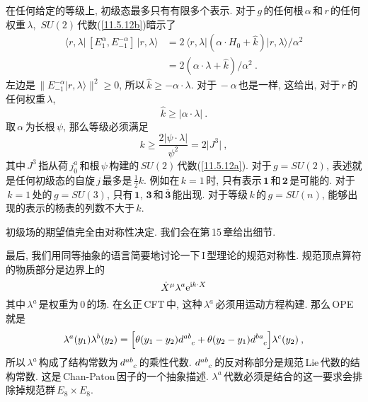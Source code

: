 在任何给定的等级上, 初级态最多只有有限多个表示. 对于$\,g\,$的任何根$\,\alpha\,$和$\,r\,$的任何权重$\,\lambda$, $\,SU(2)\,$代数(\ref{11.5.12b})暗示了
\begin{align}
    \langle r,\lambda \rvert\, [E_{1}^{\alpha},E_{-1}^{-\alpha}]\,\lvert r,\lambda\rangle 
    &= 2\,\langle r,\lambda \rvert (\alpha \cdot H_{0}+\hat{k})\rvert r,\lambda \rangle/\alpha^{2} \nonumber \\
    &=2(\alpha \cdot \lambda + \hat{k})/\alpha^{2} \:. \label{11.5.42}
\end{align}
左边是$\,\lVert E_{-1}^{-\alpha}\lvert r,\lambda\rangle \rVert^{2}\geq 0$, 所以$\,\hat{k}\geq -\alpha\cdot \lambda$. 对于$\,-\alpha\,$也是一样, 这给出, 对于$\,r\,$的任何权重$\,\lambda$,
\begin{equation}
    \hat{k} \geq \lvert \alpha \cdot \lambda \rvert \:. \label{11.5.43}
\end{equation}
取$\,\alpha\,$为长根$\,\psi$, 那么等级必须满足
\begin{equation}
    k \geq \frac{2\lvert \psi \cdot \lambda \rvert}{\psi^{2}} = 2\lvert J^{3}\rvert \:, \label{11.5.44}
\end{equation}
其中$\,J^{3}\,$指从荷$\,j_{0}^{a}\,$和根$\,\psi\,$构建的\,$SU(2)$\,代数(\ref{11.5.12a}). 对于$\,g=SU(2)$, 表述就是任何初级态的自旋$\,j\,$最多是$\,\tfrac{1}{2}k$. 例如在$\,k=1\,$时, 只有表示$\,\mathbf{1}\,$和$\,\mathbf{2}\,$是可能的. 对于$\,k=1\,$处的$\,g=SU(3)$, 只有$\,\mathbf{1}$, $\mathbf{3}\,$和$\,\bar{\mathbf{3}}\,$能出现. 对于等级$\,k\,$的$\,g=SU(n)$, 能够出现的表示的杨表的列数不大于$\,k$.

初级场的期望值完全由对称性决定. 我们会在第\,15\,章给出细节.

最后, 我们用同等抽象的语言简要地讨论一下\,I\,型理论的规范对称性. 规范顶点算符的物质部分是边界上的
\begin{equation}
    \dot{X}^{\mu}\lambda^{a}\mathrm{e}^{\mathrm{i} k\cdot X} \label{11.5.45}
\end{equation}
其中$\,\lambda^{a}\,$是权重为$\,0\,$的场. 在幺正\,CFT\,中, 这种$\,\lambda^{a}\,$必须用运动方程构建. 那么\,OPE\,就是
\begin{equation}
    \lambda^{a}(y_{1})\lambda^{b}(y_{2}) = \Bigl[\theta(y_{1}-y_{2})d\indices{^a^b_c}+
    \theta(y_{2}-y_{1})d\indices{^b^a_c}\Bigr] \lambda^{c}(y_{2}) \:, \label{11.5.46}
\end{equation}
所以$\,\lambda^{a}\,$构成了结构常数为$\,d\indices{^a^b_c}\,$的乘性代数. $d\indices{^a^b_c}\,$的反对称部分是规范\,Lie\,代数的结构常数. 这是\,Chan-Paton\,因子的一个抽象描述. $\lambda^{a}\,$代数必须是结合的这一要求会排除掉规范群$\,E_{8}\times E_{8}$.


